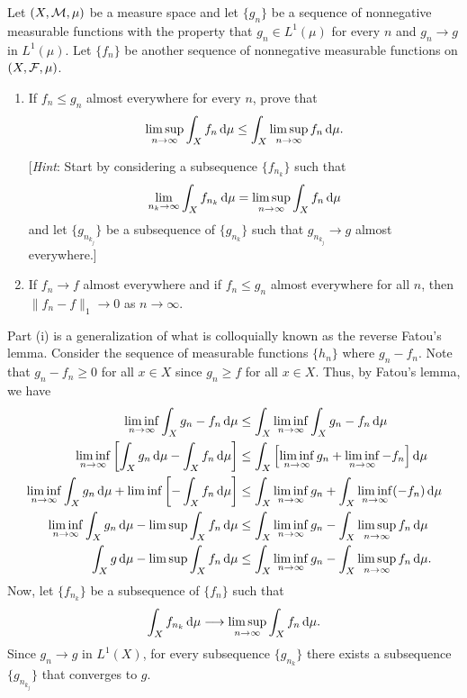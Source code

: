 \begin{problem}
  Let $(X,\mathcal{M},\mu)$ be a measure space and let $\{g_n\}$ be a sequence of
  nonnegative measurable functions with the property that $g_n\in L^1(\mu)$
  for every $n$ and $g_n\to g$ in $L^1(\mu)$. Let $\{f_n\}$ be another
  sequence of nonnegative measurable functions on $(X,\mathcal{F},\mu)$.
  \begin{enumerate}[label=(\roman*),noitemsep]
  \item If $f_n\leq g_n$ almost everywhere for every $n$, prove that
    \[
      \limsup_{n\to\infty}\int_X
      f_n\mathop{}\!\mathrm{d}\mu\leq\int_X\limsup_{n\to\infty}f_n\mathop{}\!\mathrm{d}\mu.
    \]

    [\emph{Hint}: Start by considering a subsequence $\{f_{n_k}\}$ such
    that
    \[
      \lim_{n_k\to\infty}\int_X
      f_{n_k}\mathop{}\!\mathrm{d}\mu=\limsup_{n\to\infty}\int_X f_n\mathop{}\!\mathrm{d}\mu
    \]
    and let $\{g_{n_{k_j}}\}$ be a subsequence of $\{g_{n_k}\}$ such
    that $g_{n_{k_j}}\to g$ almost everywhere.]
  \item If $f_n\to f$ almost everywhere and if $f_n\leq g_n$ almost
    everywhere for all $n$, then $\|f_n-f\|_1\to 0$ as $n\to\infty$.
  \end{enumerate}
\end{problem}
\begin{solution}
  Part (i) is a generalization of what is colloquially known as the reverse
  Fatou's lemma. Consider the sequence of measurable functions $\{h_n\}$
  where $g_n-f_n$. Note that $g_n-f_n\geq 0$ for all $x\in X$ since
  $g_n\geq f$ for all $x\in X$. Thus, by Fatou's lemma, we have
  \begin{align*}
    \liminf_{n\to\infty}\int_X g_n-f_n\diff\mu
    &\leq\int_X\liminf_{n\to\infty}\int_X g_n-f_n\diff\mu\\
    \liminf_{n\to\infty}\left[\int_X g_n\diff\mu-\int_X
    f_n\diff\mu\right]
    &\leq\int_X\left[\liminf_{n\to\infty}
      g_n+\liminf_{n\to\infty}-f_n\right]\diff\mu\\
    \liminf_{n\to\infty}\int_X g_n\diff\mu
    +\liminf\left[-\int_X f_n\diff\mu \right]
    &\leq\int_X\liminf_{n\to\infty} g_n+\int_X\liminf_{n\to\infty}
      (-f_n)\diff\mu\\
    \liminf_{n\to\infty}\int_X g_n\diff\mu
    -\limsup\int_X f_n\diff\mu
    &\leq\int_X\liminf_{n\to\infty} g_n
      -\int_X\limsup_{n\to\infty}f_n\diff\mu\\
    \int_X g\diff\mu-\limsup\int_X f_n\diff\mu
    &\leq\int_X\liminf_{n\to\infty} g_n
      -\int_X\limsup_{n\to\infty}f_n\diff\mu.
  \end{align*}
  Now, let $\{f_{n_k}\}$ be a subsequence of $\{f_n\}$ such that
  \[
    \int_X f_{n_k}\diff\mu%
    \longrightarrow%
    \limsup_{n\to\infty}\int_Xf_n\diff\mu.
  \]
  Since $g_n\to g$ in $L^1(X)$, for every subsequence $\{g_{n_k}\}$
  there exists a subsequence $\{g_{n_{k_j}}\}$ that converges to $g$.
\end{solution}

